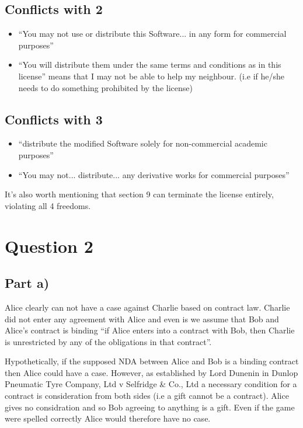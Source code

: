 \documentclass[a4paper, 6pt]{article}
\begin{document}
\subsection{Conflicts with 2}
\begin{itemize}
  \item ``You may not use or distribute this Software... in any form for commercial purposes''
  \item  ``You will distribute them under the same terms and conditions as in this license'' means that I may not be able to help my neighbour. (i.e if he/she needs to do something prohibited by the license)
\end{itemize}
\subsection{Conflicts with 3}
\begin{itemize}
  \item  ``distribute the modified Software solely for non-commercial academic purposes''
  \item  ``You may not... distribute... any derivative works for commercial purposes''
\end{itemize}

It's also worth mentioning that section 9 can terminate the license entirely, violating all 4 freedoms.

\section{Question 2}
\subsection{Part a)}
Alice clearly can not have a case against Charlie based on contract law. Charlie did not enter any agreement with Alice and even is we assume that Bob and Alice's contract is binding ``if
Alice enters into a contract with Bob, then Charlie is unrestricted by any of the obligations in that contract''. 

Hypothetically, if the supposed NDA between Alice and Bob is a binding contract then Alice could have a case. 
However, as established by Lord Dunenin in Dunlop Pneumatic Tyre Company, Ltd v Selfridge \& Co., Ltd a necessary condition for a contract is consideration from both sides (i.e a gift cannot be a contract).
Alice gives no considration and so Bob agreeing to anything is a gift. Even if the game were spelled correctly Alice would therefore have no case.
\end{document}
